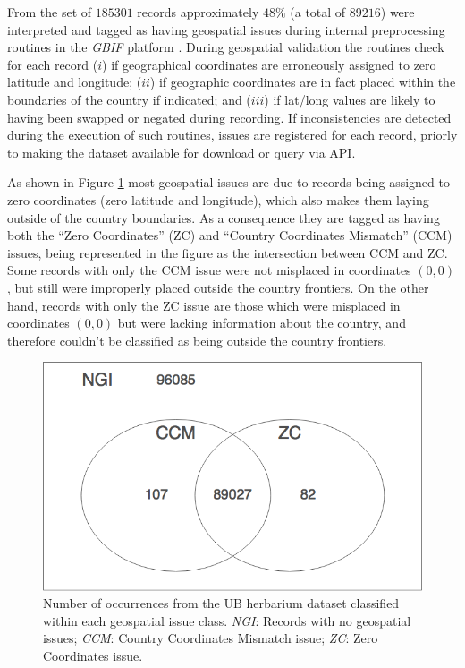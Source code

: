 From the set of $185301$ records approximately $48\%$ (a total of $89216$) were interpreted and tagged as having geospatial issues during internal preprocessing routines in the \textit{GBIF} platform \cite{GBIF.ORG}.
During geospatial validation the routines check for each record ($i$) if geographical coordinates are erroneously assigned to zero latitude and longitude; ($ii$) if geographic coordinates are in fact placed within the boundaries of the country if indicated; and ($iii$) if lat/long values are likely to having been swapped or negated during recording.
If inconsistencies are detected during the execution of such routines, issues are registered for each record, priorly to making the dataset available for download or query via API. 

As shown in Figure \ref{fig:venn_geospatial_issues} most geospatial issues are due to records being assigned to zero coordinates (zero latitude and longitude), which also makes them laying outside of the country boundaries. As a consequence they are tagged as having both the ``Zero Coordinates'' (ZC) and ``Country Coordinates Mismatch'' (CCM) issues, being represented in the figure as the intersection between CCM and ZC.
Some records with only the CCM issue were not misplaced in coordinates $(0,0)$, but still were improperly placed outside the country frontiers. 
On the other hand, records with only the ZC issue are those which were misplaced in coordinates $(0,0)$ but were lacking information about the country, and therefore couldn't be classified as being outside the country frontiers.

  \begin{figure}[h!]
  	\centering
    \includegraphics[width=0.6\linewidth]{figures/venn_geospatial_issues.png}
    \caption{Number of occurrences from the UB herbarium dataset classified within each geospatial issue class. \textit{NGI}: Records with no geospatial issues; \textit{CCM}: Country Coordinates Mismatch issue; \textit{ZC}: Zero Coordinates issue.}
    \label{fig:venn_geospatial_issues}
  \end{figure}

